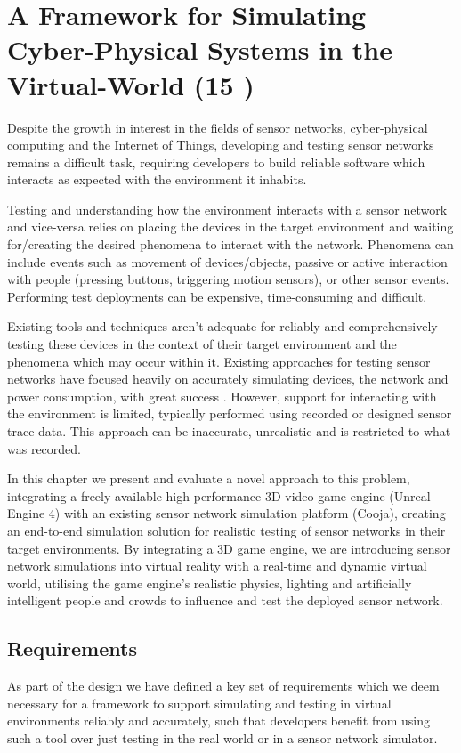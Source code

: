 \chapter{A Framework for Simulating Cyber-Physical Systems in the Virtual-World (15 )}
Despite the growth in interest in the fields of sensor networks, cyber-physical computing and the Internet of Things, developing and testing sensor networks remains a difficult task, requiring developers to build reliable software which interacts as expected with the environment it inhabits.

Testing and understanding how the environment interacts with a sensor network and vice-versa relies on placing the devices in the target environment and waiting for/creating the desired phenomena to interact with the network. Phenomena can include events such as movement of devices/objects, passive or active interaction with people (pressing buttons, triggering motion sensors), or other sensor events. Performing test deployments can be expensive, time-consuming and difficult.

Existing tools and techniques aren't adequate for reliably and comprehensively testing these devices in the context of their target environment and the phenomena which may occur within it. Existing approaches for testing sensor networks have focused heavily on accurately simulating devices, the network and power consumption, with great success \cite{cooja, tossim}. However,  support for interacting with the environment is limited, typically performed using recorded or designed sensor trace data. This approach can be inaccurate, unrealistic and is restricted to what was recorded.

In this chapter we present and evaluate a novel approach to this problem, integrating a freely available high-performance 3D video game engine (Unreal Engine 4) with an existing sensor network simulation platform (Cooja), creating an end-to-end simulation solution for realistic testing of sensor networks in their target environments. By integrating a 3D game engine, we are introducing sensor network simulations into virtual reality with a real-time and dynamic virtual world, utilising the game engine's realistic physics, lighting and artificially intelligent people and crowds to influence and test the deployed sensor network.


\section{Requirements}
\label{sub:Requirements}
As part of the design we have defined a key set of requirements which we deem necessary for a framework to support simulating and testing in virtual environments reliably and accurately, such that developers benefit from using such a tool over just testing in the real world or in a sensor network simulator.

